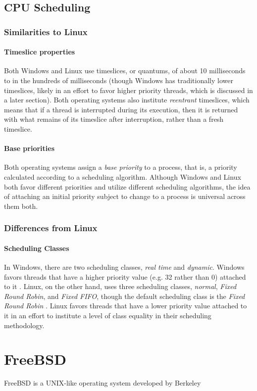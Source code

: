 \documentclass[letterpaper,10pt,titlepage]{article}
\begin{document}
\subsection{CPU Scheduling}  
\subsubsection{Similarities to Linux}
\paragraph{Timeslice properties}
Both Windows and Linux use timeslices, or quantums, of about 10 milliseconds to in the hundreds of milliseconds (though Windows has traditionally lower timeslices, likely in an effort to favor higher priority threads, which is discussed in a later section). Both operating systems also institute \emph{reentrant} timeslices, which means that if a thread is interrupted during its execution, then it is returned with what remains of its timeslice after interruption, rather than a fresh timeslice.
\paragraph{Base priorities}
Both operating systems assign a \emph{base priority} to a process, that is, a priority calculated according to a scheduling algorithm. Although Windows and Linux both favor different priorities and utilize different scheduling algorithms, the idea of attaching an initial priority subject to change to a process is universal across them both.
\subsubsection{Differences from Linux}
\paragraph{Scheduling Classes} 
In Windows, there are two scheduling classes, \emph{real time} and \emph{dynamic}. Windows favors threads that have a higher priority value (e.g. 32 rather than 0) attached to it \cite{rus122}. Linux, on the other hand, uses three scheduling classes, \emph{normal}, \emph{Fixed Round Robin}, and \emph{Fixed FIFO}, though the default scheduling class is the \emph{Fixed Round Robin} \cite{ker10}. Linux favors threads that have a lower priority value attached to it in an effort to institute a level of class equality in their scheduling methodology.

\section{FreeBSD}
FreeBSD is a UNIX-like operating system developed by Berkeley 
\end{document}
